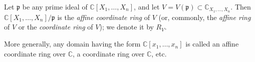 Let $\mathfrak{p}$ be any prime ideal of $\mathbb{C}[X_1, \ldots, X_n]$, and let $V = V(\mathfrak{p}) \subset \mathbb{C}_{X_1, \ldots, X_n}$. Then $\mathbb{C}[X_1, \ldots, X_n]/\mathfrak{p}$ is the \emph{affine coordinate ring} of $V$ (or, commonly, the \emph{affine ring} of $V$ or the \emph{coordinate ring} of $V$); we denote it by $R_V$.

More generally, any domain having the form $\mathbb{C}[x_1, \ldots, x_n]$ is called an affine coordinate ring over $\mathbb{C}$, a coordinate ring over $\mathbb{C}$, etc.
